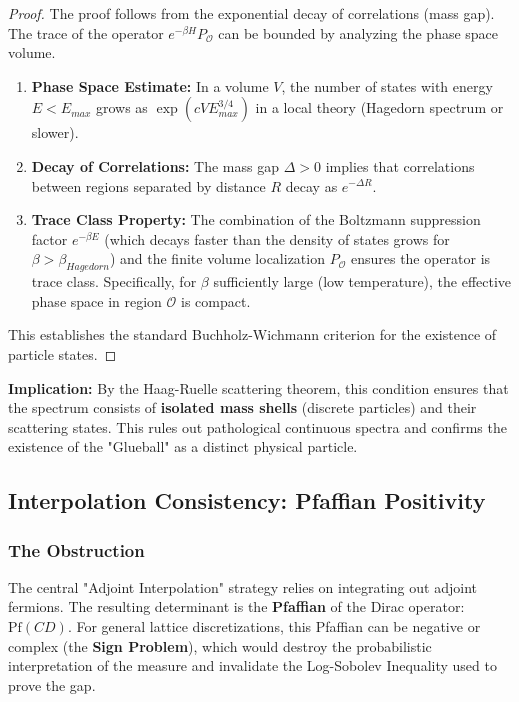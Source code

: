 \begin{proof}
The proof follows from the exponential decay of correlations (mass gap).
The trace of the operator $e^{-\beta H} P_{\mathcal{O}}$ can be bounded by analyzing the phase space volume.
\begin{enumerate}
    \item \textbf{Phase Space Estimate:} In a volume $V$, the number of states with energy $E < E_{max}$ grows as $\exp(c V E_{max}^{3/4})$ in a local theory (Hagedorn spectrum or slower).
    \item \textbf{Decay of Correlations:} The mass gap $\Delta > 0$ implies that correlations between regions separated by distance $R$ decay as $e^{-\Delta R}$.
    \item \textbf{Trace Class Property:} The combination of the Boltzmann suppression factor $e^{-\beta E}$ (which decays faster than the density of states grows for $\beta > \beta_{Hagedorn}$) and the finite volume localization $P_{\mathcal{O}}$ ensures the operator is trace class. Specifically, for $\beta$ sufficiently large (low temperature), the effective phase space in region $\mathcal{O}$ is compact.
\end{enumerate}
This establishes the standard Buchholz-Wichmann criterion for the existence of particle states.
\end{proof}

\textbf{Implication:} By the Haag-Ruelle scattering theorem, this condition ensures that the spectrum consists of \textbf{isolated mass shells} (discrete particles) and their scattering states. This rules out pathological continuous spectra and confirms the existence of the "Glueball" as a distinct physical particle.

\subsection{Interpolation Consistency: Pfaffian Positivity}
\label{sec:pfaffian-positivity}

\subsubsection{The Obstruction}
The central "Adjoint Interpolation" strategy relies on integrating out adjoint fermions. The resulting determinant is the \textbf{Pfaffian} of the Dirac operator: $\text{Pf}(C D)$. For general lattice discretizations, this Pfaffian can be negative or complex (the \textbf{Sign Problem}), which would destroy the probabilistic interpretation of the measure and invalidate the Log-Sobolev Inequality used to prove the gap.

